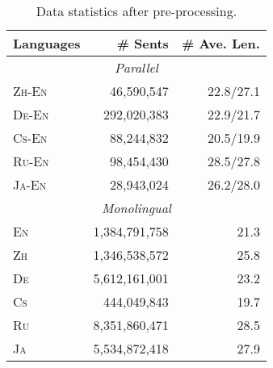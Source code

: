 \documentclass[11pt,a4paper]{article}
\begin{document}
\begin{table}[t!] 
    \centering
    \begin{tabular}{lrr} 
    \toprule 
    \textbf{Languages} & \textbf{\# Sents} & \textbf{\# Ave. Len.}\\ 
    \midrule 
    \multicolumn{3}{c}{\textit{Parallel}} \\ 
    \midrule 
    \textsc{Zh-En} & ~46,590,547 & 22.8/27.1 \\ 
    \textsc{De-En} & 292,020,383 & 22.9/21.7 \\ 
    \textsc{Cs-En} & ~88,244,832 & 20.5/19.9 \\ 
    \textsc{Ru-En} & ~98,454,430 & 28.5/27.8 \\ 
    \textsc{Ja-En} & ~28,943,024 & 26.2/28.0  \\ 
    \midrule 
    \multicolumn{3}{c}{\textit{Monolingual}} \\ 
    \midrule 
    \textsc{En} & 1,384,791,758 & 21.3 \\ 
    \textsc{Zh} & 1,346,538,572 & 25.8 \\ 
    \textsc{De} & 5,612,161,001 & 23.2 \\ 
    \textsc{Cs} & 444,049,843   & 19.7 \\ 
    \textsc{Ru} & 8,351,860,471 & 28.5 \\ 
    \textsc{Ja} & 5,534,872,418 & 27.9 \\ 
    \bottomrule 
    \end{tabular}
    \caption{\label{tab:data_statics}Data statistics after pre-processing.}
\end{table}
\end{document}
